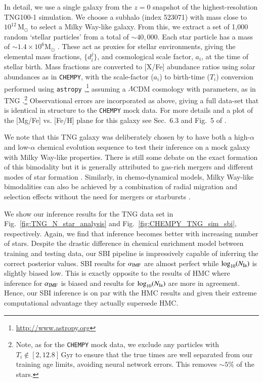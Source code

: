 \documentclass{aa}
\begin{document}
In detail, we use a single galaxy from the $z = 0$ snapshot of the highest-resolution TNG100-1 simulation. We choose a subhalo (index 523071) with mass close to $10^{12}\,\mathrm{M}_\odot$ to select a Milky Way-like galaxy. From this, we extract a set of 1,000 random `stellar particles' from a total of $\sim 40,000$. Each star particle has a mass of $\sim 1.4\times 10^6 \mathrm{M}_\odot$ \citep{2019ComAC...6....2N}. These act as proxies for stellar environments, giving the elemental mass fractions, $\{d_i^j\}$, and cosmological scale factor, $a_i$, at the time of stellar birth. Mass fractions are converted to [X/Fe] abundance ratios using \citet{2009ARA&A..47..481A} solar abundances as in \texttt{CHEMPY}, with the scale-factor ($a_i$) to birth-time ($T_i$) conversion performed using \texttt{astropy} \citep{astropy:2013,astropy:2018},\footnote{\href{http://www.astropy.org}{http://www.astropy.org}} assuming a $\Lambda$CDM cosmology with \citet{planck2015} parameters, as in TNG \citep{2018MNRAS.475..648P}.\footnote{Note, as for the \texttt{CHEMPY} mock data, we exclude any particles with $T_i\notin[2,12.8]\,\mathrm{Gyr}$ to ensure that the true times are well separated from our training age limits, avoiding neural network errors. This removes $\sim5\%$ of the stars.} Observational errors are incorporated as above, giving a full data-set that is identical in structure to the \texttt{CHEMPY} mock data. For more details and a plot of the [Mg/Fe] vs. [Fe/H] plane for this galaxy see Sec.~6.3 and Fig.~5 of \citet{Philcox_2019}.

We note that this TNG galaxy was deliberately chosen by \citet{Philcox_2019} to have both a high-$\alpha$ and low-$\alpha$ chemical evolution sequence to test their inference on a mock galaxy with Milky Way-like properties. There is still some debate on the exact formation of this bimodality but it is generally attributed to gas-rich mergers and different modes of star formation \citep[e.g.][]{2018MNRAS.474.3629G,2018MNRAS.477.5072M,2019MNRAS.484.3476C,Buck2020,Buck2023}. Similarly, in chemo-dynamical models, Milky Way-like bimodalities can also be achieved by a combination of radial migration and selection effects without the need for mergers or starbursts \citep[e.g.][]{2009MNRAS.396..203S,2013A&A...558A...9M,2017ApJ...835..224A}.

We show our inference results for the TNG data set in Fig.~\ref{fig:TNG_N_star_analysis} and Fig.~\ref{fig:CHEMPY_TNG_sim_sbi}, respectively.
Again, we find that inference becomes better with increasing number of stars. Despite the drastic difference in chemical enrichment model between training and testing data, our SBI pipeline is impressively capable of inferring the correct posterior values. SBI results for $\alpha_{\rm IMF}$ are almost perfect while $\log_{10}(N_{\rm Ia})$ is slightly biased low. This is exactly opposite to the results of HMC where inference for $\alpha_{\rm IMF}$ is biased and results for $\log_{10}(N_{\rm Ia})$ are more in agreement. Hence, our SBI inference is on par with the HMC results and given their extreme computational advantage they actually supersede HMC.
\end{document}

